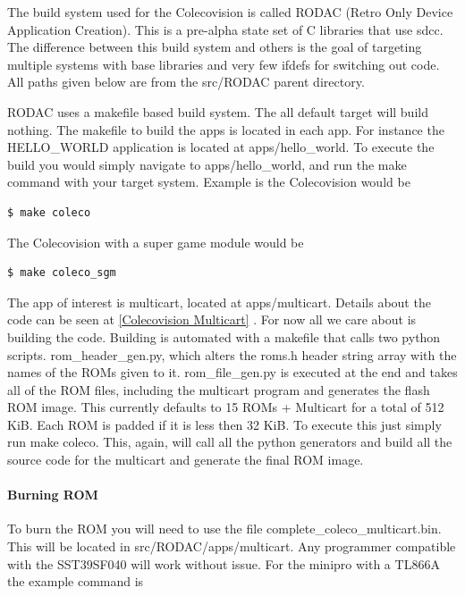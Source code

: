 \documentclass{article}
\begin{document}
  \par
  The build system used for the Colecovision is called RODAC (Retro Only Device Application Creation). This is a pre-alpha state set of C libraries that use sdcc.
  The difference between this build system and others is the goal of targeting multiple systems with base libraries and very few ifdefs for switching out code.
  All paths given below are from the src/RODAC parent directory.
  \par
  RODAC uses a makefile based build system. The all default target will build nothing. The makefile to build the apps is located in each app. For instance
  the HELLO\_WORLD application is located at apps/hello\_world. To execute the build you would simply navigate to apps/hello\_world, and run the make command with
  your target system. Example is the Colecovision would be

  \begin{lstlisting}[language=bash]
    $ make coleco
  \end{lstlisting}

  The Colecovision with a super game module would be

  \begin{lstlisting}[language=bash]
    $ make coleco_sgm
  \end{lstlisting}

  \par
  The app of interest is multicart, located at apps/multicart. Details about the code can be seen at \ref{Colecovision Multicart} . For now all we care about is building
  the code. Building is automated with a makefile that calls two python scripts. rom\_header\_gen.py, which alters the roms.h header string array with the names of the ROMs
  given to it. rom\_file\_gen.py is executed at the end and takes all of the ROM files, including the multicart program and generates the flash ROM image. This currently
  defaults to 15 ROMs + Multicart for a total of 512 KiB. Each ROM is padded if it is less then 32 KiB. To execute this just simply run make coleco. This, again, will
  call all the python generators and build all the source code for the multicart and generate the final ROM image.

  \paragraph{Burning ROM}
  To burn the ROM you will need to use the file complete\_coleco\_multicart.bin. This will be located in src/RODAC/apps/multicart. Any programmer compatible with the
  SST39SF040 will work without issue. For the minipro with a TL866A the example command is
\end{document}
